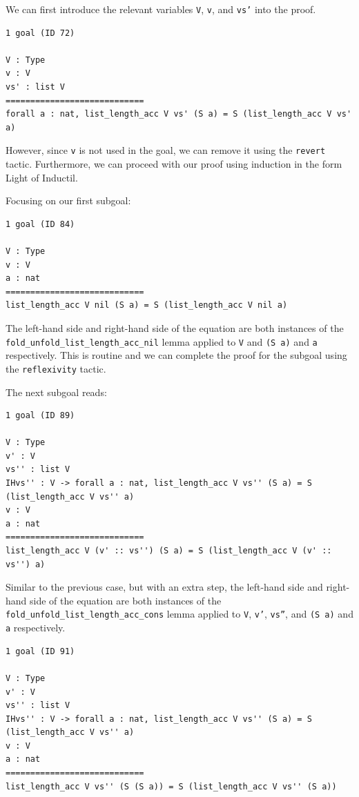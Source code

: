 \documentclass{article}
\begin{document}
We can first introduce the relevant variables \texttt{V}, \texttt{v}, and \texttt{vs'} into the proof.

\begin{lstlisting}
1 goal (ID 72)

V : Type
v : V
vs' : list V
============================
forall a : nat, list_length_acc V vs' (S a) = S (list_length_acc V vs' a)
\end{lstlisting}

However, since \texttt{v} is not used in the goal, we can remove it using the \texttt{revert} tactic. Furthermore, we can proceed with our proof using induction in the form Light of Inductil.

Focusing on our first subgoal:

\begin{lstlisting}
1 goal (ID 84)

V : Type
v : V
a : nat
============================
list_length_acc V nil (S a) = S (list_length_acc V nil a)
\end{lstlisting}

The left-hand side and right-hand side of the equation are both instances of the \texttt{fold\_unfold\_list\_length\_acc\_nil} lemma applied to \texttt{V} and \texttt{(S a)} and \texttt{a} respectively. This is routine and we can complete the proof for the subgoal using the \texttt{reflexivity} tactic.

The next subgoal reads:

\begin{lstlisting}
1 goal (ID 89)

V : Type
v' : V
vs'' : list V
IHvs'' : V -> forall a : nat, list_length_acc V vs'' (S a) = S (list_length_acc V vs'' a)
v : V
a : nat
============================
list_length_acc V (v' :: vs'') (S a) = S (list_length_acc V (v' :: vs'') a)
\end{lstlisting}

Similar to the previous case, but with an extra step, the left-hand side and right-hand side of the equation are both instances of the \texttt{fold\_unfold\_list\_length\_acc\_cons} lemma applied to \texttt{V}, \texttt{v'}, \texttt{vs''}, and \texttt{(S a)} and \texttt{a} respectively.

\begin{lstlisting}
1 goal (ID 91)

V : Type
v' : V
vs'' : list V
IHvs'' : V -> forall a : nat, list_length_acc V vs'' (S a) = S (list_length_acc V vs'' a)
v : V
a : nat
============================
list_length_acc V vs'' (S (S a)) = S (list_length_acc V vs'' (S a))
\end{lstlisting}
\end{document}

